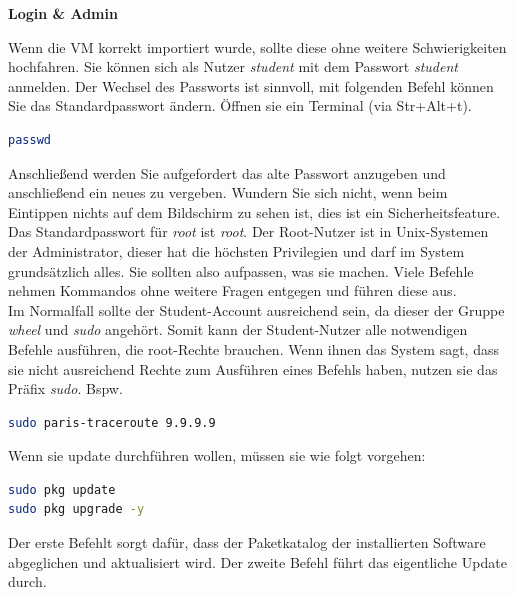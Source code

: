 \documentclass[paper=a4,fontsize=11pt]{scrartcl}%
\numberwithin{equation}{section}
\begin{document}
\begin{center}
\Large{\textbf{Login \& Admin}}
\end{center}
Wenn die VM korrekt importiert wurde, sollte diese ohne weitere Schwierigkeiten hochfahren. Sie können sich als Nutzer \emph{student} mit dem Passwort \emph{student} anmelden. Der Wechsel des Passworts ist sinnvoll, mit folgenden Befehl können Sie das Standardpasswort ändern. Öffnen sie ein Terminal (via Str+Alt+t).
\begin{lstlisting}[style=Bash, language=Bash]
passwd
\end{lstlisting}
Anschließend werden Sie aufgefordert das alte Passwort anzugeben und anschließend ein neues zu vergeben. Wundern Sie sich nicht, wenn beim Eintippen nichts auf dem Bildschirm zu sehen ist, dies ist ein Sicherheitsfeature.\\
Das Standardpasswort für \emph{root} ist \emph{root}. Der Root-Nutzer ist in Unix-Systemen der Administrator, dieser hat die höchsten Privilegien und darf im System grundsätzlich alles. Sie sollten also aufpassen, was sie machen. Viele Befehle nehmen Kommandos ohne weitere Fragen entgegen und führen diese aus.\\
Im Normalfall sollte der Student-Account ausreichend sein, da dieser der Gruppe \emph{wheel} und \emph{sudo} angehört. Somit kann der Student-Nutzer alle notwendigen Befehle ausführen, die root-Rechte brauchen. Wenn ihnen das System sagt, dass sie nicht ausreichend Rechte zum Ausführen eines Befehls haben, nutzen sie das Präfix \emph{sudo}. Bspw.\\
\begin{lstlisting}[style=Bash, language=Bash]
sudo paris-traceroute 9.9.9.9
\end{lstlisting}
Wenn sie update durchführen wollen, müssen sie wie folgt vorgehen:
\begin{lstlisting}[style=Bash, language=Bash]
sudo pkg update
sudo pkg upgrade -y
\end{lstlisting}
Der erste Befehlt sorgt dafür, dass der Paketkatalog der installierten Software abgeglichen und aktualisiert wird. Der zweite Befehl führt das eigentliche Update durch. 
\end{document}
